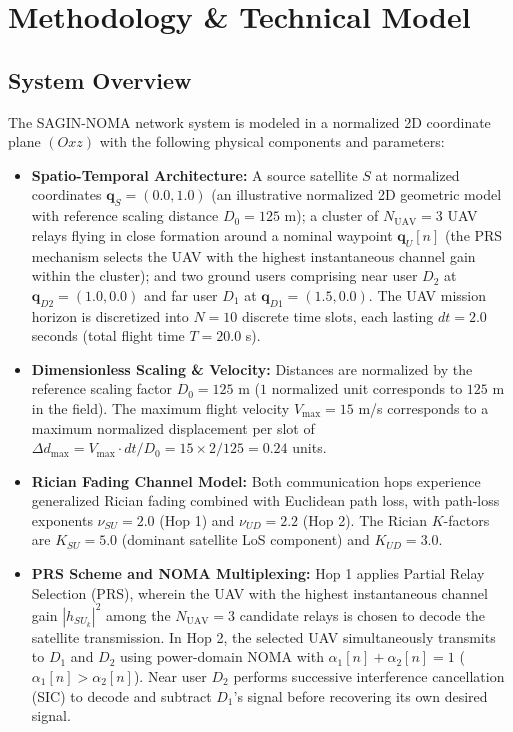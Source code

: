 \section{Methodology \& Technical Model}
\label{sec:methodology}

\subsection*{System Overview}

The SAGIN-NOMA network system is modeled in a normalized 2D coordinate plane $(Oxz)$ with the following physical components and parameters:
\begin{itemize}
    \item \textbf{Spatio-Temporal Architecture:} A source satellite $S$ at normalized coordinates $\mathbf{q}_S = (0.0, 1.0)$ (an illustrative normalized 2D geometric model with reference scaling distance $D_0 = 125$ m); a cluster of $N_{\text{UAV}} = 3$ UAV relays flying in close formation around a nominal waypoint $\mathbf{q}_U[n]$ (the PRS mechanism selects the UAV with the highest instantaneous channel gain within the cluster); and two ground users comprising near user $D_2$ at $\mathbf{q}_{D2} = (1.0, 0.0)$ and far user $D_1$ at $\mathbf{q}_{D1} = (1.5, 0.0)$. The UAV mission horizon is discretized into $N = 10$ discrete time slots, each lasting $dt = 2.0$ seconds (total flight time $T = 20.0$ s).
    \item \textbf{Dimensionless Scaling \& Velocity:} Distances are normalized by the reference scaling factor $D_0 = 125$ m ($1$ normalized unit corresponds to $125$ m in the field). The maximum flight velocity $V_{\max} = 15$ m/s corresponds to a maximum normalized displacement per slot of $\Delta d_{\max} = V_{\max} \cdot dt / D_0 = 15 \times 2 / 125 = 0.24$ units.
    \item \textbf{Rician Fading Channel Model:} Both communication hops experience generalized Rician fading combined with Euclidean path loss, with path-loss exponents $\nu_{SU} = 2.0$ (Hop 1) and $\nu_{UD} = 2.2$ (Hop 2). The Rician $K$-factors are $K_{SU} = 5.0$ (dominant satellite LoS component) and $K_{UD} = 3.0$.
    \item \textbf{PRS Scheme and NOMA Multiplexing:} Hop 1 applies Partial Relay Selection (PRS), wherein the UAV with the highest instantaneous channel gain $|h_{SU_k}|^2$ among the $N_{\text{UAV}} = 3$ candidate relays is chosen to decode the satellite transmission. In Hop 2, the selected UAV simultaneously transmits to $D_1$ and $D_2$ using power-domain NOMA with $\alpha_1[n] + \alpha_2[n] = 1$ ($\alpha_1[n] > \alpha_2[n]$). Near user $D_2$ performs successive interference cancellation (SIC) to decode and subtract $D_1$'s signal before recovering its own desired signal.
\end{itemize}

